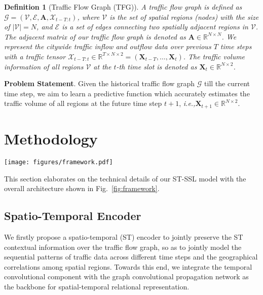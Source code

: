 \documentclass[letterpaper]{article} \usepackage{aaai23}  \usepackage{times}  \usepackage{helvet}  \usepackage{courier}  \usepackage[hyphens]{url}  \usepackage{graphicx} \urlstyle{rm} \def\UrlFont{\rm}  \usepackage{natbib}  \usepackage{caption} \frenchspacing  \setlength{\pdfpagewidth}{8.5in} \setlength{\pdfpageheight}{11in}
\newtheorem{mydef}{Definition}
\newcommand{\ie}{\emph{i.e.,}\xspace}
\newcommand{\name}{ST-SSL\xspace}
\newcommand{\figureautorefname}{Fig.}
\begin{document}
\begin{mydef}[Traffic Flow Graph (TFG)]
A traffic flow graph is defined as $\mathcal{G} = \left(\mathcal{V}, \mathcal{E}, \bm A, \mathcal{X}_{t-T:t}\right)$, where $\mathcal{V}$ is the set of spatial regions (nodes) with the size of $|\mathcal{V}| = N$, and $\mathcal{E}$ is a set of edges connecting two spatially adjacent regions in $\mathcal{V}$. The adjacent matrix of our traffic flow graph is denoted as $\bm A \in \mathbb{R}^{N \times N}$. We represent the citywide traffic inflow and outflow data over previous $T$ time steps with a traffic tensor $\mathcal{X}_{t-T:t} \in \mathbb{R}^{T \times N \times 2} = \left(\bm X_{t-T}, \dots, \bm X_{t} \right)$. The traffic volume information of all regions $\mathcal{V}$ at the $t$-th time slot is denoted as $\bm X_{t} \in \mathbb{R}^{N \times 2}$. 
\end{mydef}



\noindent \textbf{Problem Statement}. Given the historical traffic flow graph $\mathcal{G}$ till the current time step, we aim to learn a predictive function which accurately estimates the traffic volume of all regions at the future time step $t+1$, \ie $\bm X_{t+1} \in \mathbb{R}^{N \times 2}$.

\section{Methodology}\label{sec:method}

\begin{figure*}[t]
    \centering
    \texttt{[image: figures/framework.pdf]}
    \vspace{-0.2cm}
    \caption{(a): The overall architecture of \name. (b): Spatial heterogeneity modeling. (c): Temporal heterogeneity modeling.}
    \vspace{-0.4cm}
    \label{fig:framework}
\end{figure*}




This section elaborates on the technical details of our \name model with the overall architecture shown in \figureautorefname~\ref{fig:framework}.

\subsection{Spatio-Temporal Encoder}

We firstly propose a spatio-temporal (ST) encoder to jointly preserve the ST contextual information over the traffic flow graph, so as to jointly model the sequential patterns of traffic data across different time steps and the geographical correlations among spatial regions. Towards this end, we integrate the temporal convolutional component with the graph convolutional propagation network as the backbone for spatial-temporal relational representation.
\end{document}

